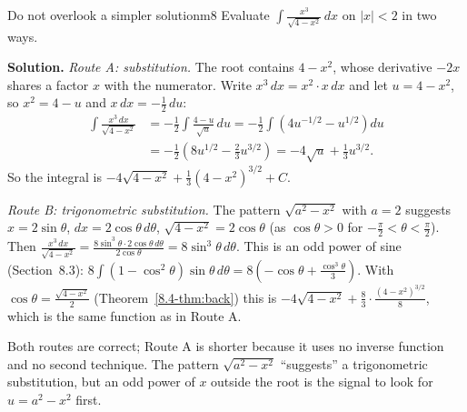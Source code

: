 \documentclass[11pt]{article}
\begin{document}
\begin{exmp}{Do not overlook a simpler solution}{m8}
Evaluate $\displaystyle\int\frac{x^3}{\sqrt{4-x^2}}\,dx$ on $\lvert x\rvert<2$ in two ways.

\textbf{Solution.} \emph{Route A: substitution.} The root contains $4-x^2$, whose derivative $-2x$ shares a factor $x$ with the numerator. Write $x^3\,dx=x^2\cdot x\,dx$ and let $u=4-x^2$, so $x^2=4-u$ and $x\,dx=-\frac12\,du$:
\begin{align*}\int\frac{x^3\,dx}{\sqrt{4-x^2}}&=-\frac12\int\frac{4-u}{\sqrt u}\,du=-\frac12\int\left(4u^{-1/2}-u^{1/2}\right)du\\&=-\frac12\left(8u^{1/2}-\frac23u^{3/2}\right)=-4\sqrt u+\frac13u^{3/2}.\end{align*}
So the integral is $-4\sqrt{4-x^2}+\frac13(4-x^2)^{3/2}+C$.

\emph{Route B: trigonometric substitution.} The pattern $\sqrt{a^2-x^2}$ with $a=2$ suggests $x=2\sin\theta$, $dx=2\cos\theta\,d\theta$, $\sqrt{4-x^2}=2\cos\theta$ (as $\cos\theta>0$ for $-\frac\pi2<\theta<\frac\pi2$). Then $\frac{x^3\,dx}{\sqrt{4-x^2}}=\frac{8\sin^3\theta\cdot2\cos\theta\,d\theta}{2\cos\theta}=8\sin^3\theta\,d\theta$. This is an odd power of sine (Section~8.3): $8\int(1-\cos^2\theta)\sin\theta\,d\theta=8\left(-\cos\theta+\frac{\cos^3\theta}3\right)$. With $\cos\theta=\frac{\sqrt{4-x^2}}2$ (Theorem~\ref{8.4-thm:back}) this is $-4\sqrt{4-x^2}+\frac83\cdot\frac{(4-x^2)^{3/2}}8$, which is the same function as in Route A.

Both routes are correct; Route A is shorter because it uses no inverse function and no second technique. The pattern $\sqrt{a^2-x^2}$ ``suggests'' a trigonometric substitution, but an odd power of $x$ outside the root is the signal to look for $u=a^2-x^2$ first.
\end{exmp}
\end{document}
